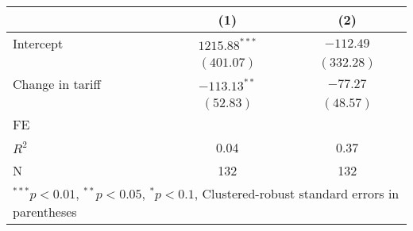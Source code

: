 
\begin{tabular}{l c c }
\hline
 & (1) & (2) \\
\hline
Intercept & $1215.88^{***}$ & $-112.49$  \\
            & $(401.07)$      & $(332.28)$ \\
Change in tariff     & $-113.13^{**}$  & $-77.27$   \\
            & $(52.83)$       & $(48.57)$  \\
\hline
FE          &                &                \\ 
\hline
$R^2$       & 0.04            & 0.37       \\
N           & 132             & 132        \\
\hline
\multicolumn{3}{l}{\scriptsize{$^{***}p<0.01$, $^{**}p<0.05$, $^*p<0.1$, Clustered-robust standard errors in parentheses}}
\end{tabular}
